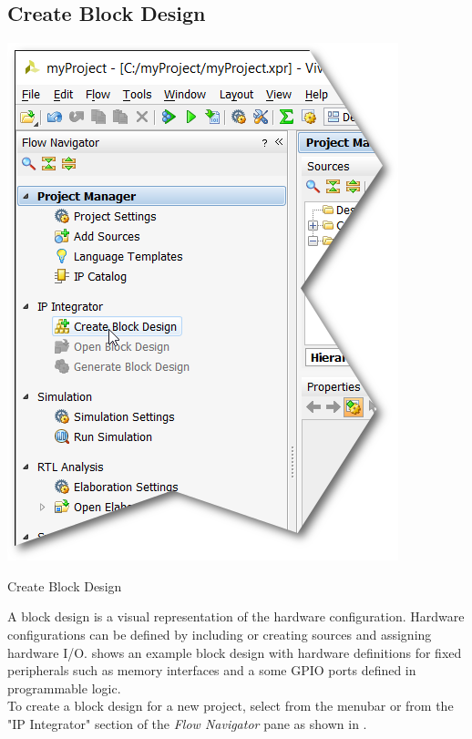 \subsection{Create Block Design}

\begin{marginfigure}
	\centering
	\includegraphics{images/vivado/create_block_diagram.png}
	\caption[Create Block Design]{Create Block Design}
	\label{fig:createblockdesign}
\end{marginfigure}


A block design is a visual representation of the hardware configuration. Hardware configurations can be defined by including or creating sources and assigning hardware I/O.  shows an example block design with hardware definitions for fixed peripherals such as memory interfaces and a some GPIO ports defined in programmable logic. \\


To create a block design for a new project, select  from the menubar or from the "IP Integrator" section of the \textit{Flow Navigator} pane as shown in . \\


